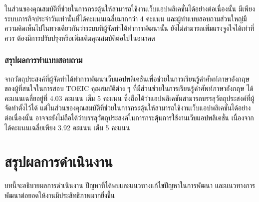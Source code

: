 \documentclass[12pt,oneside,openright,a4paper]{cpe-thai-project}
\begin{document}
\hspace{1cm}
ในส่วนของคุณสมบัติที่ช่วยในการกระตุ้นให้สามารถใช้งานเว็บแอปพลิเคชั่นได้อย่างต่อเนื่องนั้น
มีเพียงระบบภารกิจประจำวันเท่านั้นที่ได้คะแนนเฉลี่ยมากกว่า 4 คะแนน
และผู้ทำแบบสอบถามส่วนใหญ่มีความคิดเห็นไปในทางเดียวกันว่าระบบที่ผู้จัดทำได้ทำการพัฒนานั้น
ยังไม่สามารถเพิ่มแรงจูงใจได้เท่าที่ควร ต้องมีการปรับปรุงหรือเพิ่มเติมคุณสมบัติต่อไปในอนาคต
\pagebreak
\subsection{สรุปผลการทำแบบสอบถาม}

\hspace{1cm}
จากวัตถุประสงค์ที่ผู้จัดทำได้ทำการพัฒนาเว็บแอปพลิเคชันเพื่อช่วยในการเรียนรู้คำศัพท์ภาษาอังกฤษ ของผู้ที่สนใจในการสอบ TOEIC
คุณสมบัติต่าง ๆ ที่มีส่วนช่วยในการเรียนรู้คำศัพท์ภาษาอังกฤษ ได้คะแนนเฉลี่ยอยู่ที่ 4.03 คะแนน เต็ม 5 คะแนน 
ซึ่งถือได้ว่าแอปพลิเคชันสามารถบรรลุวัตถุประสงค์ที่ผู้จัดทำตั้งไว้ได้ แต่ในส่วนของคุณสมบัติที่ช่วยในการกระตุ้นให้สามารถใช้งานเว็บแอปพลิเคชั่นได้อย่างต่อเนื่องนั้น
อาจจะยังไม่ถือได้ว่าบรรลุวัตถุประสงค์ในการกระตุ้นการใช้งานเว็บแอปพลิเคชั่น
เนื่องจากได้คะแนนเฉลี่ยเพียง 3.92 คะแนน เต็ม 5 คะแนน 


\chapter{สรุปผลการดำเนินงาน}
\hspace{1cm}
บทนี้จะอธิบายผลการดำเนินงาน ปัญหาที่ได้พบและแนวทางแก้ไขปัญหาในการพัฒนา และแนวทางการพัฒนาต่อยอดให้งานมีประสิทธิภาพมากยิ่งขึ้น
\end{document}
